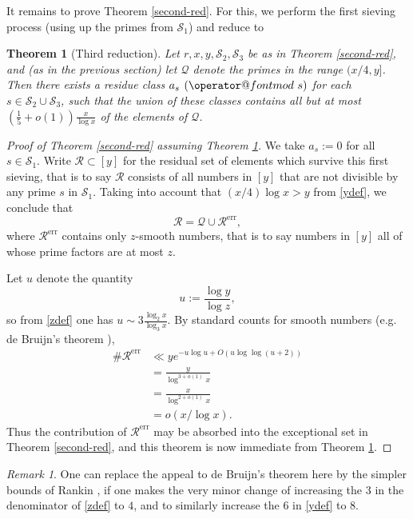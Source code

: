 \documentclass[12pt]{amsart}
\makeatletter
\numberwithin{equation}{section}  %
\theoremstyle{remark}
\newtheorem{remark}{Remark}
\theoremstyle{plain}
\newtheorem{thm}{Theorem}
\numberwithin{equation}{section}
\renewcommand{\pmod}[1]{\allowbreak\mkern7mu({\operator@font mod}\,\,#1)}
\renewcommand{\(}{\left(}
\renewcommand{\)}{\right)}
\newcommand{\asym}{\sim}   %
\newcommand{\QQ}{\mathcal{Q}}
\newcommand{\cS}{\mathcal{S}}
\newcommand{\cR}{\mathcal{R}}
\newcommand{\err}{\operatorname{err}}
\makeatother
\begin{document}
It remains to prove Theorem \ref{second-red}.  For this, we perform the first sieving process (using up the primes from $\cS_1$) and reduce to

\begin{thm}[Third reduction]\label{third-red}  Let $r,x,y,\cS_2,\cS_3$
  be as in Theorem \ref{second-red}, and (as in the previous section)
  let $\QQ$ denote the primes in the range $(x/4,y]$.  Then there
    exists a residue class $a_s \pmod s$ for each $s \in \cS_2 \cup
    \cS_3$, such that the union of these classes contains all but at most $(\frac{1}{5} + o(1)) \frac{x}{\log x}$ of the elements of $\QQ$.
\end{thm}

\begin{proof}[Proof of Theorem \ref{second-red} assuming Theorem \ref{third-red}]  We take $a_s := 0$ for all $s\in \cS_1$.
Write $\cR \subset [y]$ for the residual set of elements
which survive this first sieving, that is to say $\cR$ consists of all numbers in $[y]$ that are not divisible by any prime $s$ in $\cS_1$. Taking into account that
$(x/4)\log x>y$ from \eqref{ydef}, we conclude that 
$$\cR = \QQ \cup \cR^{\err},$$
where $\cR^{\err}$ contains only $z$-smooth
  numbers, that is to say numbers in $[y]$ all of
  whose prime factors are at most $z$.

Let $u$ denote the quantity
$$ u := \frac{\log y}{\log z},$$
so from \eqref{zdef} one has $u \asym 3 \frac{\log_2 x}{\log_3 x}$.  
By standard counts for smooth numbers (e.g. de Bruijn's theorem \cite{deB}),
\begin{align*}
\# \cR^{\err}  &\ll y e^{-u\log u + O( u \log\log(u+2) ) } \\
&= \frac{y}{\log^{3+o(1)} x} \\
&= \frac{x}{\log^{2+o(1)} x} \\
&= o( x/\log x).
\end{align*}
Thus the contribution of $\cR^{\err}$ may be absorbed into the exceptional set in Theorem \ref{second-red}, and this theorem is now immediate from Theorem \ref{third-red}.
\end{proof}

\begin{remark} One can replace the appeal to de Bruijn's theorem here by the simpler bounds of Rankin \cite[Lemma II]{R1}, if one makes the very minor change of increasing the $3$ in the denominator of \eqref{zdef} to $4$, and to similarly increase the $6$ in \eqref{ydef} to $8$. 
\end{remark}
\end{document}
